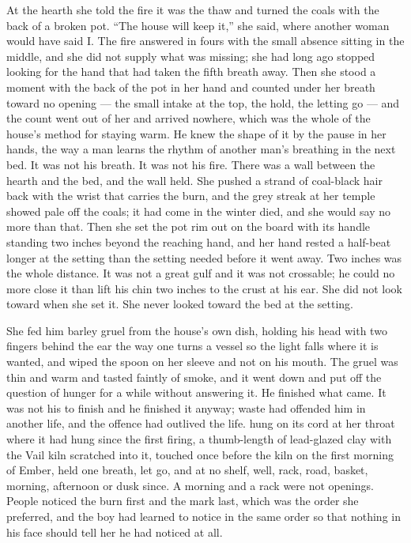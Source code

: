 At the hearth she told the fire it was the thaw and turned the coals with the back of a broken pot. “The house will keep it,” she said, where another woman would have said I. The fire answered in fours with the small absence sitting in the middle, and she did not supply what was missing; she had long ago stopped looking for the hand that had taken the fifth breath away. Then she stood a moment with the back of the pot in her hand and counted under her breath toward no opening --- the small intake at the top, the hold, the letting go --- and the count went out of her and arrived nowhere, which was the whole of the house's method for staying warm. He knew the shape of it by the pause in her hands, the way a man learns the rhythm of another man's breathing in the next bed. It was not his breath. It was not his fire. There was a wall between the hearth and the bed, and the wall held. She pushed a strand of coal-black hair back with the wrist that carries the burn, and the grey streak at her temple showed pale off the coals; it had come in the winter  died, and she would say no more than that. Then she set the pot rim out on the board with its handle standing two inches beyond the reaching hand, and her hand rested a half-beat longer at the setting than the setting needed before it went away. Two inches was the whole distance. It was not a great gulf and it was not crossable; he could no more close it than lift his chin two inches to the crust at his ear. She did not look toward  when she set it. She never looked toward the bed at the setting.

She fed him barley gruel from the house's own dish, holding his head with two fingers behind the ear the way one turns a vessel so the light falls where it is wanted, and wiped the spoon on her sleeve and not on his mouth. The gruel was thin and warm and tasted faintly of smoke, and it went down and put off the question of hunger for a while without answering it. He finished what came. It was not his to finish and he finished it anyway; waste had offended him in another life, and the offence had outlived the life.  hung on its cord at her throat where it had hung since the first firing, a thumb-length of lead-glazed clay with the Vail kiln scratched into it, touched once before the kiln on the first morning of Ember, held one breath, let go, and at no shelf, well, rack, road, basket, morning, afternoon or dusk since. A morning and a rack were not openings. People noticed the burn first and the mark last, which was the order she preferred, and the boy had learned to notice in the same order so that nothing in his face should tell her he had noticed at all.

